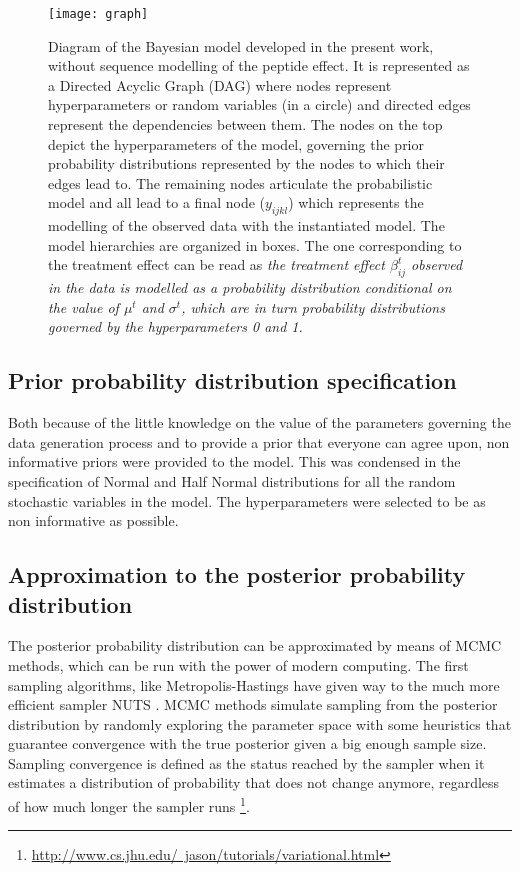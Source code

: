 \begin{figure}[!h]
\centering
\texttt{[image: graph]}
\caption{Diagram of the Bayesian model developed in the present work, without sequence modelling of the peptide effect. It is represented as a Directed Acyclic Graph (\ac{DAG}) where nodes represent hyperparameters or random variables (in a circle) and directed edges  represent the dependencies between them. The nodes on the top depict the hyperparameters of the model, governing the prior probability distributions represented by the nodes to which their edges lead to. The remaining nodes articulate the probabilistic model and all lead to a final node ($y_{ijkl}$) which represents the modelling of the observed data with the instantiated model. The model hierarchies are organized in boxes. The one corresponding to the treatment effect can be read as \textit{the treatment effect $\beta_{ij}^{t}$ observed in the data is modelled as a probability distribution conditional on the value of $\mu^t$ and $\sigma^t$, which are in turn probability distributions governed by the hyperparameters 0 and 1.}}
\label{fig:daft_model}
\end{figure}

\subsection{Prior probability distribution specification}

Both because of the little knowledge on the value of the parameters governing the data generation process and to provide a prior that everyone can agree upon, non informative priors were provided to the model. This was condensed in the specification of Normal and Half Normal distributions for all the random stochastic variables in the model. The hyperparameters were selected to be as non informative as possible.



\subsection{Approximation to the posterior probability distribution}

The posterior probability distribution can be approximated by means of \ac{MCMC} methods, which can be run with the power of modern computing. The first sampling algorithms, like Metropolis-Hastings \cite{Chib1995} have given way to the much more efficient sampler \ac{NUTS} \cite{Hoffman2011}. \ac{MCMC} methods simulate sampling from the posterior distribution by randomly exploring the parameter space with some heuristics that guarantee convergence with the true posterior given a big enough sample size. Sampling convergence is defined as the status reached by the sampler when it estimates a distribution of probability that does not change anymore, regardless of how much longer the sampler runs \cite{Tran2018} \footnote{\href{http://www.cs.jhu.edu/~jason/tutorials/variational.html}{http://www.cs.jhu.edu/~jason/tutorials/variational.html}}.

